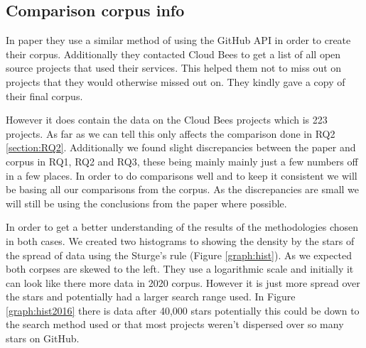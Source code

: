\documentclass[10pt,conference]{IEEEtran}
\begin{document}
\vspace*{-0.05in}
\subsection{Comparison corpus info}
\label{section:HiltonComaprisonCoprusTHing}
\vspace*{-0.05in}
In \citet{Hilton2016} paper they use a similar method of using the GitHub API in order to create their corpus. Additionally they contacted Cloud Bees \citet{CloudBees2020} to get a list of all open source projects that used their services. This helped them not to miss out on projects that they would otherwise missed out on. They kindly gave a copy of their final corpus. 

However it does contain the data on the Cloud Bees projects which is 223 projects. As far as we can tell this only affects the comparison done in RQ2 \ref{section:RQ2}. Additionally we found slight discrepancies between the paper and corpus in RQ1, RQ2 and RQ3, these being mainly mainly just a few numbers off in a few places. In order to do comparisons well and to keep it consistent we will be basing all our comparisons from the corpus. As the discrepancies are small we will still be using the conclusions from the paper where possible.  

In order to get a better understanding of the results of the methodologies chosen in both cases. We created two histograms to showing the density by the stars of the spread of data using the Sturge's rule (Figure \ref{graph:hist}). As we expected both corpses are skewed to the left. They use a logarithmic scale and initially it can look like there more data in 2020 corpus. However it is just more spread over the stars and potentially had a larger search range used. In Figure \ref{graph:hist2016} there is data after 40,000 stars potentially this could be down to the search method used or that most projects weren't dispersed over so many stars on GitHub.   
\end{document}
